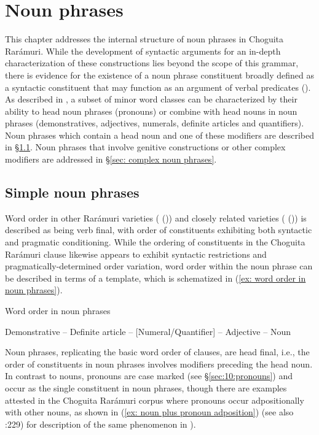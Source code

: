 \chapter{Noun phrases}
\label{chap: noun phrases}

This chapter addresses the internal structure of noun phrases in Choguita Rarámuri. While the development of syntactic arguments for an in-depth characterization of these constructions lies beyond the scope of this grammar, there is evidence for the existence of a noun phrase constituent broadly defined as a syntactic constituent that may function as an argument of verbal predicates (\citealt{dryer2007noun}). As described in , a subset of minor word classes can be characterized by their ability to head noun phrases (pronouns) or combine with head nouns in noun phrases (demonstratives, adjectives, numerals, definite articles and quantifiers). Noun phrases which contain a head noun and one of these modifiers are described in §\ref{sec: simple noun phrases}. Noun phrases that involve genitive constructions or other complex modifiers are addressed in §\ref{sec: complex noun phrases}.

\section{Simple noun phrases}
\label{sec: simple noun phrases}

Word order in other Rarámuri varieties ( (\citealt[64]{moralesmoreno2016rochecahi})) and closely related varieties ( (\citealt[73]{miller1996guarijio})) is described as being verb final, with order of constituents exhibiting both syntactic and pragmatic conditioning. While the ordering of constituents in the Choguita Rarámuri clause likewise appears to exhibit syntactic restrictions and pragmatically-determined order variation, word order within the noun phrase can be described in terms of a template, which is schematized in (\ref{ex: word order in noun phrases}).

\ea\label{ex: word order in noun phrases}
{Word order in noun phrases}

Demonstrative -- Definite article -- [Numeral/Quantifier] -- Adjective -- Noun

\z

Noun phrases, replicating the basic word order of clauses, are head final, i.e., the order of constituents in noun phrases involves modifiers preceding the head noun. In contrast to nouns, pronouns are case marked (see §\ref{sec:10:pronouns}) and occur as the single constituent in noun phrases, though there are examples attested in the Choguita Rarámuri corpus where pronouns occur adpositionally with other nouns, as shown in (\ref{ex: noun plus pronoun adposition}) (see also \citealt{miller1996guarijio}:229) for description of the same phenomenon in ).

